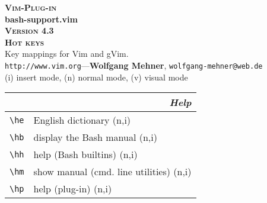 \documentclass[oneside,11pt,landscape,DIV16]{scrartcl}
\newcommand{\Pluginversion}{4.3}
\begin{document}
%

\begin{multicols}{3}
%
\begin{center}
%
\textbf{\textsc{\small{Vim-Plug-in}}}\\
\textbf{\LARGE{bash-support.vim}}\\
\textbf{\textsc{\small{Version \Pluginversion}}}\\
\vspace{1mm}%
\textbf{\textsc{\Huge{Hot keys}}}\\ 
\vspace{1mm}%
Key mappings for Vim and gVim.\\
{\tiny  \texttt{http://www.vim.org}\hspace{1.5mm}---\hspace{1.5mm}\textbf{Wolfgang Mehner},  \texttt{wolfgang-mehner@web.de}}\\
\vspace{1.0mm}
{\normalsize (i)} insert mode, {\normalsize (n)} normal mode, {\normalsize (v)} visual mode\\
\vspace{1.0mm}
%
\begin{tabular}[]{|p{11mm}|p{60mm}|}
\hline
\multicolumn{2}{|r|}{\textsl{\textbf{H}elp}}\\[1.0ex]
\hline \verb'\he'   & English dictionary                \hfill (n,i)\\
\hline \verb'\hb'   & display the Bash manual           \hfill (n,i)\\
\hline \verb'\hh'   & help (Bash builtins)              \hfill (n,i)\\
\hline \verb'\hm'   & show manual (cmd. line utilities) \hfill (n,i)\\
\hline \verb'\hp'   & help (plug-in)                    \hfill (n,i)\\
\hline

\end{tabular}
\end{center}
\end{multicols}
\end{document}
